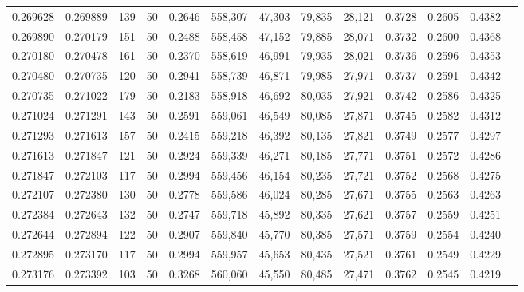 \begin{tabular}{rrrrrrrrrrrrr}
0.269628 & 0.269889 &   139 &  50 &                                     0.2646 & 558,307 &  47,303 &  79,835 &  28,121 & 0.3728 & 0.2605 & 0.4382 \\
0.269890 & 0.270179 &   151 &  50 &                                     0.2488 & 558,458 &  47,152 &  79,885 &  28,071 & 0.3732 & 0.2600 & 0.4368 \\
0.270180 & 0.270478 &   161 &  50 &                                     0.2370 & 558,619 &  46,991 &  79,935 &  28,021 & 0.3736 & 0.2596 & 0.4353 \\
0.270480 & 0.270735 &   120 &  50 &                                     0.2941 & 558,739 &  46,871 &  79,985 &  27,971 & 0.3737 & 0.2591 & 0.4342 \\
0.270735 & 0.271022 &   179 &  50 &                                     0.2183 & 558,918 &  46,692 &  80,035 &  27,921 & 0.3742 & 0.2586 & 0.4325 \\
0.271024 & 0.271291 &   143 &  50 &                                     0.2591 & 559,061 &  46,549 &  80,085 &  27,871 & 0.3745 & 0.2582 & 0.4312 \\
0.271293 & 0.271613 &   157 &  50 &                                     0.2415 & 559,218 &  46,392 &  80,135 &  27,821 & 0.3749 & 0.2577 & 0.4297 \\
0.271613 & 0.271847 &   121 &  50 &                                     0.2924 & 559,339 &  46,271 &  80,185 &  27,771 & 0.3751 & 0.2572 & 0.4286 \\
0.271847 & 0.272103 &   117 &  50 &                                     0.2994 & 559,456 &  46,154 &  80,235 &  27,721 & 0.3752 & 0.2568 & 0.4275 \\
0.272107 & 0.272380 &   130 &  50 &                                     0.2778 & 559,586 &  46,024 &  80,285 &  27,671 & 0.3755 & 0.2563 & 0.4263 \\
0.272384 & 0.272643 &   132 &  50 &                                     0.2747 & 559,718 &  45,892 &  80,335 &  27,621 & 0.3757 & 0.2559 & 0.4251 \\
0.272644 & 0.272894 &   122 &  50 &                                     0.2907 & 559,840 &  45,770 &  80,385 &  27,571 & 0.3759 & 0.2554 & 0.4240 \\
0.272895 & 0.273170 &   117 &  50 &                                     0.2994 & 559,957 &  45,653 &  80,435 &  27,521 & 0.3761 & 0.2549 & 0.4229 \\
0.273176 & 0.273392 &   103 &  50 &                                     0.3268 & 560,060 &  45,550 &  80,485 &  27,471 & 0.3762 & 0.2545 & 0.4219 \\

\end{tabular}
